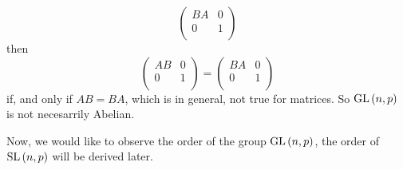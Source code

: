 \begin{example}
\begin{enumerate}
\begin{equation*}
        \begin{pmatrix}
          BA  &   0   \\
          0   &   1   \\
        \end{pmatrix}
      \end{equation*} then
      \begin{equation*}
        \begin{pmatrix}
          AB  &   0   \\
          0   &   1   \\
        \end{pmatrix}=
        \begin{pmatrix}
          BA  &   0   \\
          0   &   1   \\
        \end{pmatrix}
      \end{equation*}
      if, and only if $AB=BA$, which is in general, not true for matrices. So
      $\operatorname{GL}{(n,p)}$ is not necesarrily Abelian.
  \end{enumerate}
\end{example}

Now, we would like to observe the order of the group $\operatorname{GL}{(n,p)}$, the order of
$\operatorname{SL}{(n,p)}$ will be derived later.

